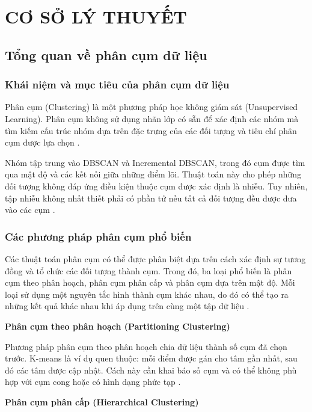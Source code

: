 \chapter{CƠ SỞ LÝ THUYẾT}

\section{Tổng quan về phân cụm dữ liệu}
\subsection{Khái niệm và mục tiêu của phân cụm dữ liệu}

Phân cụm (Clustering) là một phương pháp học không giám sát (Unsupervised Learning). Phân cụm không sử dụng nhãn lớp có sẵn để xác định các nhóm mà tìm kiếm cấu trúc nhóm dựa trên đặc trưng của các đối tượng và tiêu chí phân cụm được lựa chọn \parencite{sklearnClusteringGuide}.

Nhóm tập trung vào DBSCAN và Incremental DBSCAN, trong đó cụm được tìm qua mật độ và các kết nối giữa những điểm lõi. Thuật toán này cho phép những đối tượng không đáp ứng điều kiện thuộc cụm được xác định là nhiễu. Tuy nhiên, tập nhiễu không nhất thiết phải có phần tử nếu tất cả đối tượng đều được đưa vào các cụm \parencite{ester1996dbscan}.

\subsection{Các phương pháp phân cụm phổ biến}

Các thuật toán phân cụm có thể được phân biệt dựa trên cách xác định sự tương đồng và tổ chức các đối tượng thành cụm. Trong đó, ba loại phổ biến là phân cụm theo phân hoạch, phân cụm phân cấp và phân cụm dựa trên mật độ. Mỗi loại sử dụng một nguyên tắc hình thành cụm khác nhau, do đó có thể tạo ra những kết quả khác nhau khi áp dụng trên cùng một tập dữ liệu \parencite{sklearnClusteringGuide}.

\textbf{Phân cụm theo phân hoạch (Partitioning Clustering)}

Phương pháp phân cụm theo phân hoạch chia dữ liệu thành số cụm đã chọn trước. K-means là ví dụ quen thuộc: mỗi điểm được gán cho tâm gần nhất, sau đó các tâm được cập nhật. Cách này cần khai báo số cụm và có thể không phù hợp với cụm cong hoặc có hình dạng phức tạp \parencite{machinelearningcoban}.

\textbf{Phân cụm phân cấp (Hierarchical Clustering)}

